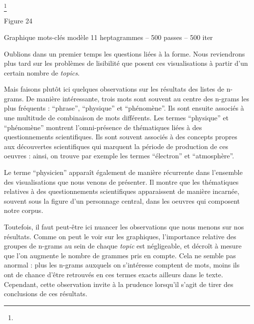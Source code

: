\documentclass[letterpaper,portrait,12pt]{article}
\begin{document}
\footnote{} 


Figure 24





Graphique mots-cl\'{e}s mod\`{e}le 11 heptagrammes -- 500 passes -- 500 iter




















\textcolor[rgb]{0.000,0.000,0.000}{	Oublions dans un premier temps les questions li\'{e}es \`{a} la forme. Nous reviendrons plus tard sur les probl\`{e}mes de lisibilit\'{e} que posent ces visualisations \`{a} partir d'un certain nombre de }\emph{\textcolor[rgb]{0.000,0.000,0.000}{topics}}\textcolor[rgb]{0.000,0.000,0.000}{.}





\textcolor[rgb]{0.000,0.000,0.000}{	Mais faisons plut\^{o}t ici quelques observations sur les r\'{e}sultats des listes de n-grams. De mani\`{e}re int\'{e}ressante, trois mots sont souvent au centre des n-grams les plus fr\'{e}quents : {``}phrase'', {``}physique'' et {``}ph\'{e}nom\`{e}ne''. Ils sont ensuite associ\'{e}s \`{a} une multitude de combinaison de mots diff\'{e}rents. Les termes {``}physique'' et {``}ph\'{e}nom\`{e}ne'' montrent l'omni-pr\'{e}sence de th\'{e}matiques li\'{e}es \`{a} des questionnements scientifiques. Ils sont souvent associ\'{e}s \`{a} des concepts propres aux d\'{e}couvertes scientifiques qui marquent la p\'{e}riode de production de ces oeuvres : ainsi, on trouve par exemple les termes {``}\'{e}lectron'' et {``}atmosph\`{e}re''. }





	Le terme {``}physicien'' appara\^{i}t \'{e}galement de mani\`{e}re r\'{e}currente dans l'ensemble des visualisations que nous venons de pr\'{e}senter. Il montre que les th\'{e}matiques relatives \`{a} des questionnements scientifiques apparaissent de mani\`{e}re incarn\'{e}e, souvent sous la figure d'un personnage central, dans les oeuvres qui composent notre corpus.


	Toutefois, il faut peut-\^{e}tre ici nuancer les observations que nous menons sur nos r\'{e}sultats. Comme on peut le voir sur les graphiques, l'importance relative des groupes de n-grams au sein de chaque \emph{topic} est n\'{e}gligeable, et d\'{e}cro\^{i}t \`{a} mesure que l'on augmente le nombre de grammes pris en compte. Cela ne semble pas anormal : plus les n-grams auxquels on s'int\'{e}resse comptent de mots, moins ils ont de chance d'\^{e}tre retrouv\'{e}s en ces termes exacts ailleurs dans le texte. Cependant, cette observation invite \`{a} la prudence lorsqu'il s'agit de tirer des conclusions de ces r\'{e}sultats.
\end{document}
